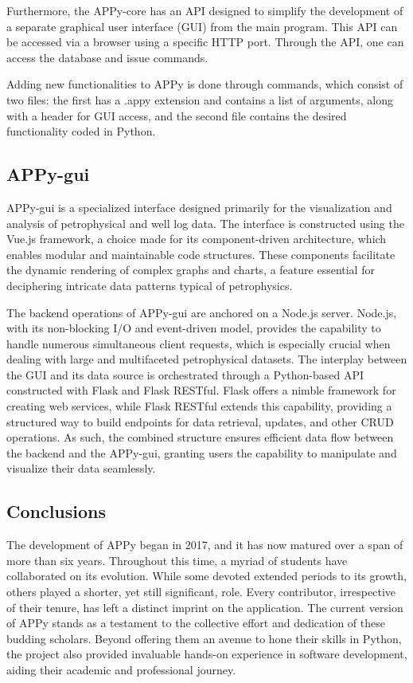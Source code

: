 \documentclass[10pt,twocolumn,twoside]{article}
\begin{document}
Furthermore, the APPy-core has an API designed to simplify the development of a separate graphical user interface (GUI) from the main program. This API can be accessed via a browser using a specific HTTP port. Through the API, one can access the database and issue commands.

Adding new functionalities to APPy is done through commands, which consist of two files: the first has a .appy extension and contains a list of arguments, along with a header for GUI access, and the second file contains the desired functionality coded in Python.

\subsection{APPy-gui}
APPy-gui is a specialized interface designed primarily for the visualization and analysis of petrophysical and well log data. The interface is constructed using the Vue.js framework, a choice made for its component-driven architecture, which enables modular and maintainable code structures. These components facilitate the dynamic rendering of complex graphs and charts, a feature essential for deciphering intricate data patterns typical of petrophysics.

The backend operations of APPy-gui are anchored on a Node.js server. Node.js, with its non-blocking I/O and event-driven model, provides the capability to handle numerous simultaneous client requests, which is especially crucial when dealing with large and multifaceted petrophysical datasets. The interplay between the GUI and its data source is orchestrated through a Python-based API constructed with Flask and Flask RESTful. Flask offers a nimble framework for creating web services, while Flask RESTful extends this capability, providing a structured way to build endpoints for data retrieval, updates, and other CRUD operations. As such, the combined structure ensures efficient data flow between the backend and the APPy-gui, granting users the capability to manipulate and visualize their data seamlessly.

\subsection{Conclusions}
The development of APPy began in 2017, and it has now matured over a span of more than six years. Throughout this time, a myriad of students have collaborated on its evolution. While some devoted extended periods to its growth, others played a shorter, yet still significant, role. Every contributor, irrespective of their tenure, has left a distinct imprint on the application. The current version of APPy stands as a testament to the collective effort and dedication of these budding scholars. Beyond offering them an avenue to hone their skills in Python, the project also provided invaluable hands-on experience in software development, aiding their academic and professional journey.
\end{document}
